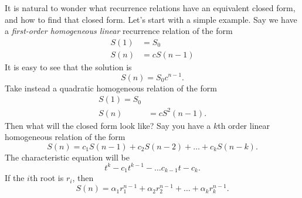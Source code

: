 \documentclass[nobib]{tufte-handout}
\begin{document}
It is natural to wonder what recurrence relations have an 
equivalent closed form, and how to find that closed form. Let's start 
with a simple example. Say we have a \emph{first-order homogeneous 
linear} recurrence relation of the form
\begin{align*}
    S(1) &= S_0 \\
    S(n) &= cS(n-1)
\end{align*}
It is easy to see that the solution is 
\[S(n) = S_0 c^{n-1}.\]
Take instead a quadratic homogeneous relation of the form
\begin{align*}
    S(1) = S_0 \\
    S(n) &= cS^2(n-1).
\end{align*}
Then what will the closed form look like? 
Say you have a $k$th order linear homogeneous relation of the form
\[S(n) = c_1 S(n-1) + c_2 S(n-2) + \dots + c_k S(n-k).\]
The characteristic equation will be 
\[t^k - c_1 t^{k-1} - \dots c_{k-1} t - c_k.\]
If the $i$th root is $r_i$, then 
\[S(n) = \alpha_1 r_1^{n-1} + \alpha_2 r_2^{n-1} + \dots + \alpha_k r_k^{n-1}.\]
\end{document}
